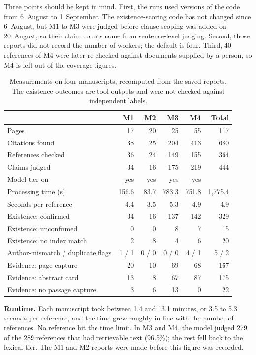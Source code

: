 \documentclass{article}
\begin{document}
Three points should be kept in mind. First, the runs used versions of the code from 6~August to 1~September. The existence-scoring code has not changed since 6~August, but M1 to M3 were judged before clause scoping was added on 20~August, so their claim counts come from sentence-level judging. Second, those reports did not record the number of workers; the default is four. Third, 40 references of M4 were later re-checked against documents supplied by a person, so M4 is left out of the coverage figures.

\begin{table}[htbp]
\centering
\caption{Measurements on four manuscripts, recomputed from the saved reports. The existence outcomes are tool outputs and were not checked against independent labels.}
\label{tab:operating}
\small
\begin{tabular}{@{}l r r r r r@{}}
\toprule
& \textbf{M1} & \textbf{M2} & \textbf{M3} & \textbf{M4} & \textbf{Total}\\
\midrule
Pages & 17 & 20 & 25 & 55 & 117\\
Citations found & 38 & 25 & 204 & 413 & 680\\
References checked & 36 & 24 & 149 & 155 & 364\\
Claims judged & 34 & 16 & 175 & 219 & 444\\
Model tier on & yes & yes & yes & yes & \\
Processing time (s) & 156.6 & 83.7 & 783.3 & 751.8 & 1{,}775.4\\
Seconds per reference & 4.4 & 3.5 & 5.3 & 4.9 & 4.9\\
\midrule
Existence: confirmed & 34 & 16 & 137 & 142 & 329\\
Existence: unconfirmed & 0 & 0 & 8 & 7 & 15\\
Existence: no index match & 2 & 8 & 4 & 6 & 20\\
Author-mismatch / duplicate flags & 1 / 1 & 0 / 0 & 0 / 0 & 4 / 1 & 5 / 2\\
\midrule
Evidence: page capture & 20 & 10 & 69 & 68 & 167\\
Evidence: abstract card & 13 & 8 & 67 & 87 & 175\\
Evidence: no passage capture & 3 & 6 & 13 & 0 & 22\\
\bottomrule
\end{tabular}
\end{table}

\textbf{Runtime.} Each manuscript took between 1.4 and 13.1 minutes, or 3.5 to 5.3 seconds per reference, and the time grew roughly in line with the number of references. No reference hit the time limit. In M3 and M4, the model judged 279 of the 289 references that had retrievable text (96.5\%); the rest fell back to the lexical tier. The M1 and M2 reports were made before this figure was recorded.
\end{document}
